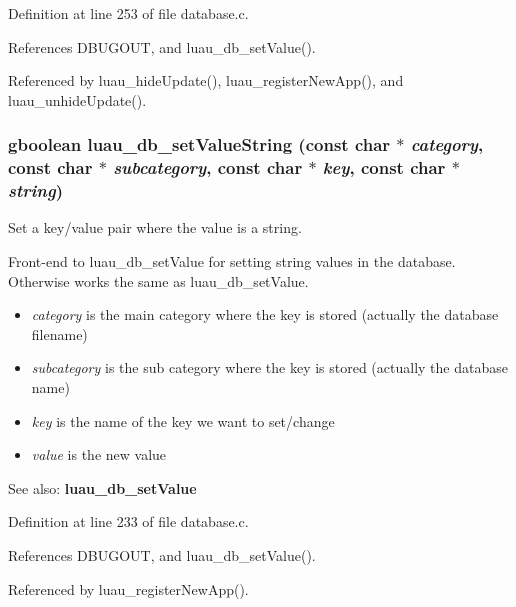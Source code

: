 Definition at line 253 of file database.c.

References DBUGOUT, and luau\_\-db\_\-set\-Value().

Referenced by luau\_\-hide\-Update(), luau\_\-register\-New\-App(), and luau\_\-unhide\-Update().
\subsubsection{\setlength{\rightskip}{0pt plus 5cm}gboolean luau\_\-db\_\-set\-Value\-String (const char $\ast$ {\em category}, const char $\ast$ {\em subcategory}, const char $\ast$ {\em key}, const char $\ast$ {\em string})}\label{database_8h_a6}


Set a key/value pair where the value is a string. 

Front-end to luau\_\-db\_\-set\-Value for setting string values in the database. Otherwise works the same as luau\_\-db\_\-set\-Value.

\begin{itemize}
\item {\em category\/} is the main category where the key is stored (actually the database filename) \item {\em subcategory\/} is the sub category where the key is stored (actually the database name) \item {\em key\/} is the name of the key we want to set/change \item {\em value\/} is the new value\end{itemize}
\begin{Desc}
\item[See also:]{\bf luau\_\-db\_\-set\-Value} \end{Desc}


Definition at line 233 of file database.c.

References DBUGOUT, and luau\_\-db\_\-set\-Value().

Referenced by luau\_\-register\-New\-App().